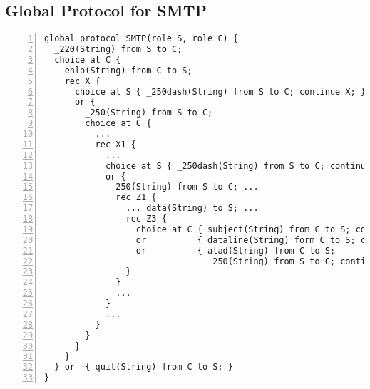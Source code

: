 \subsection{Global Protocol for SMTP}
\label{app:smtp_global}

\begin{lstlisting}[numbers=left]
global protocol SMTP(role S, role C) {
  _220(String) from S to C;
  choice at C {
    ehlo(String) from C to S;
    rec X {
      choice at S { _250dash(String) from S to C; continue X; }
      or {
        _250(String) from S to C;
        choice at C {
          ...
          rec X1 {
            ...
            choice at S { _250dash(String) from S to C; continue X1; }
            or {
              250(String) from S to C; ...
              rec Z1 {
                ... data(String) to S; ...
                rec Z3 {
                  choice at C { subject(String) from C to S; continue Z3;  }
                  or          { dataline(String) form C to S; continue Z3; }
                  or          { atad(String) from C to S;
                                _250(String) from S to C; continue Z1;     }
                }
              }
              ...  
            }  
            ... 
          }
        }
      }
    }
  } or  { quit(String) from C to S; }
}
\end{lstlisting}

